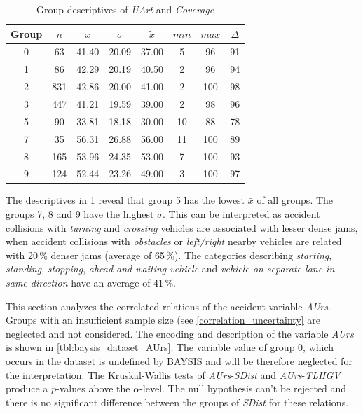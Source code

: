 \begin{table}[ht!]
	\tiny
	\centering
	\begin{tabular}{c|c|c|c|c|c|c|c}
		\toprule
		Group & $n$ & $\bar{x}$ & $\sigma$ & $\tilde{x}$ & $min$ & $max$ & $\Delta$ \\ 
		\midrule
		0 & 63  & 41.40 & 20.09 & 37.00 & 5  & 96  & 91 \\ 
		1 & 86  & 42.29 & 20.19 & 40.50 & 2  & 96  & 94 \\ 
		2 & 831 & 42.86 & 20.00 & 41.00 & 2  & 100 & 98 \\ 
		3 & 447 & 41.21 & 19.59 & 39.00 & 2  & 98  & 96 \\  
		5 & 90  & 33.81 & 18.18 & 30.00 & 10 & 88  & 78 \\ 
		7 & 35  & 56.31 & 26.88 & 56.00 & 11 & 100 & 89 \\ 
		8 & 165 & 53.96 & 24.35 & 53.00 & 7  & 100 & 93 \\ 
		9 & 124 & 52.44 & 23.26 & 49.00 & 3  & 100 & 97 \\ 
		\bottomrule
	\end{tabular}
	\caption{Group descriptives of \textit{UArt} and \textit{Coverage}}
	\label{tbl:descriptives_baysis_matched_UArt_Cov}
\end{table}
The descriptives in \cref{tbl:descriptives_baysis_matched_UArt_Cov} reveal that group 5 has the lowest $\bar{x}$ of all groups. The groups 7, 8 and 9 have the highest $\sigma$. This can be interpreted as accident collisions with \textit{turning} and \textit{crossing} vehicles are associated with lesser dense jams, when accident collisions with \textit{obstacles} or \textit{left/right} nearby vehicles are related with 20\,\% denser jams (average of 65\,\%). The categories describing \textit{starting}, \textit{standing}, \textit{stopping}, \textit{ahead and waiting vehicle} and \textit{vehicle on separate lane in same direction} have an average of 41\,\%.

This section analyzes the correlated relations of the accident variable \textit{AUrs}. Groups with an insufficient sample size (see \cref{correlation_uncertainty} are neglected and not considered. The encoding and description of the variable \textit{AUrs} is shown in \cref{tbl:baysis_dataset_AUrs}. The variable value of group 0, which occurs in the dataset is undefined by BAYSIS and will be therefore neglected for the interpretation. The Kruskal-Wallis tests of \textit{AUrs}-\textit{SDist} and \textit{AUrs}-\textit{TLHGV} produce a $p$-values above the $\alpha$-level. The null hypothesis can't be rejected and there is no significant difference between the groups of \textit{SDist} for these relations.

